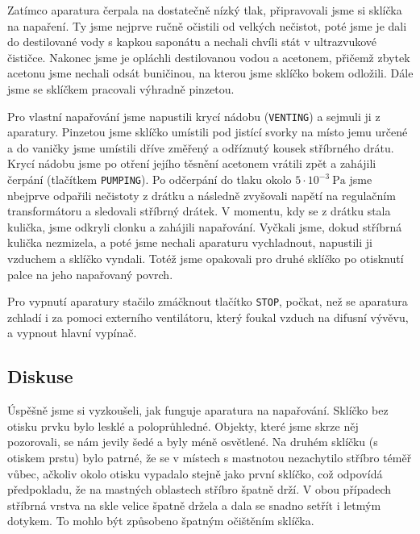 \documentclass[english]{article}
\newcommand{\unit}[1]{~\mathrm{#1}}
\begin{document}
		
		Zatímco aparatura čerpala na dostatečně nízký tlak, připravovali jsme si sklíčka na napaření. Ty jsme nejprve ručně očistili od velkých nečistot, poté jsme je dali do destilované vody s kapkou saponátu a nechali chvíli stát v ultrazvukové čističce. Nakonec jsme je opláchli destilovanou vodou a acetonem, přičemž zbytek acetonu jsme nechali odsát buničinou, na kterou jsme sklíčko bokem odložili. Dále jsme se sklíčkem pracovali výhradně pinzetou.
		
		Pro vlastní napařování jsme napustili krycí nádobu (\texttt{VENTING}) a sejmuli ji z aparatury. Pinzetou jsme sklíčko umístili pod jistící svorky na místo jemu určené a do vaničky jsme umístili dříve změřený a odříznutý kousek stříbrného drátu. Krycí nádobu jsme po otření jejího těsnění acetonem vrátili zpět a zahájili čerpání (tlačítkem \texttt{PUMPING}). Po odčerpání do tlaku okolo $5\cdot 10^{-3}\unit{Pa}$ jsme nbejprve odpařili nečistoty z drátku a následně zvyšovali napětí na regulačním transformátoru a sledovali stříbrný drátek. V momentu, kdy se z drátku stala kulička, jsme odkryli clonku a zahájili napařování. Vyčkali jsme, dokud stříbrná kulička nezmizela, a poté jsme nechali aparaturu vychladnout, napustili ji vzduchem a sklíčko vyndali. Totéž jsme opakovali pro druhé sklíčko po otisknutí palce na jeho napařovaný povrch. 
		
		Pro vypnutí aparatury stačilo zmáčknout tlačítko \texttt{STOP}, počkat, než se aparatura zchladí i za pomoci externího ventilátoru, který foukal vzduch na difusní vývěvu, a vypnout hlavní vypínač.
			
					
	\subsection{Diskuse}
		Úspěšně jsme si vyzkoušeli, jak funguje aparatura na napařování. Sklíčko bez otisku prvku bylo lesklé a poloprůhledné. Objekty, které jsme skrze něj pozorovali, se nám jevily šedé a byly méně osvětlené. Na druhém sklíčku (s otiskem prstu) bylo patrné, že se v místech s mastnotou nezachytilo stříbro téměř vůbec, ačkoliv okolo otisku vypadalo stejně jako první sklíčko, což odpovídá předpokladu, že na mastných oblastech stříbro špatně drží. V obou případech stříbrná vrstva na skle velice špatně držela a dala se snadno setřít i letmým dotykem. To mohlo být způsobeno špatným očištěním sklíčka.
								
\end{document}
